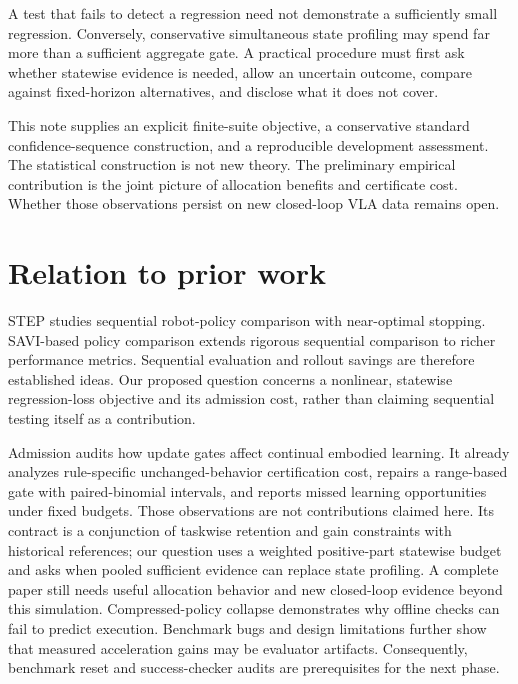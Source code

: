 \documentclass[conference]{IEEEtran}
\begin{document}
A test that fails to detect a regression need not demonstrate a sufficiently small regression. Conversely, conservative simultaneous state profiling may spend far more than a sufficient aggregate gate. A practical procedure must first ask whether statewise evidence is needed, allow an uncertain outcome, compare against fixed-horizon alternatives, and disclose what it does not cover.

This note supplies an explicit finite-suite objective, a conservative standard confidence-sequence construction, and a reproducible development assessment. The statistical construction is not new theory. The preliminary empirical contribution is the joint picture of allocation benefits and certificate cost. Whether those observations persist on new closed-loop VLA data remains open.

\section{Relation to prior work}

STEP \cite{step} studies sequential robot-policy comparison with near-optimal stopping. SAVI-based policy comparison \cite{savi} extends rigorous sequential comparison to richer performance metrics. Sequential evaluation and rollout savings are therefore established ideas. Our proposed question concerns a nonlinear, statewise regression-loss objective and its admission cost, rather than claiming sequential testing itself as a contribution.

Admission \cite{admission} audits how update gates affect continual embodied learning. It already analyzes rule-specific unchanged-behavior certification cost, repairs a range-based gate with paired-binomial intervals, and reports missed learning opportunities under fixed budgets. Those observations are not contributions claimed here. Its contract is a conjunction of taskwise retention and gain constraints with historical references; our question uses a weighted positive-part statewise budget and asks when pooled sufficient evidence can replace state profiling. A complete paper still needs useful allocation behavior and new closed-loop evidence beyond this simulation. Compressed-policy collapse \cite{collapse} demonstrates why offline checks can fail to predict execution. Benchmark bugs and design limitations \cite{bugs} further show that measured acceleration gains may be evaluator artifacts. Consequently, benchmark reset and success-checker audits are prerequisites for the next phase.
\end{document}
